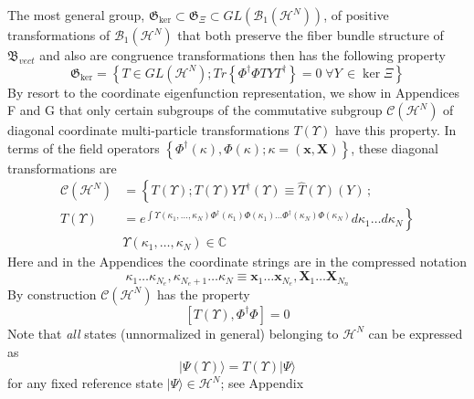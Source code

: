 \documentclass[aps,preprint]{revtex4}%
\begin{document}
The most general group, $\mathfrak{G}_{\ker}\subset\mathfrak{G}_{\Xi}\subset
GL\left(  \mathcal{B}_{1}\left(  \mathcal{H}^{N}\right)  \right)  $, of
positive transformations of $\mathcal{B}_{1}\left(  \mathcal{H}^{N}\right)  $
that both preserve the fiber bundle structure of $\mathfrak{B}_{vect}$ and
also are congruence transformations then has the following property
\begin{equation}
\mathfrak{G}_{\ker}=\left\{  T\in GL(\mathcal{H}^{N});Tr\left\{  \Phi
^{\dagger}\Phi TYT^{\dagger}\right\}  =0\;\forall Y\,\in\ker\Xi\text{
}\right\}  \label{GLkerXi}%
\end{equation}
By resort to the coordinate eigenfunction representation, we show in
Appendices F and G that only certain subgroups of the commutative subgroup
$\mathcal{C}(\mathcal{H}^{N})$ of diagonal coordinate multi-particle
transformations $T(\Upsilon)$ have this property. In terms of the field
operators $\left\{  \Phi^{\dagger}\left(  \kappa\right)  ,\Phi\left(
\kappa\right)  ;\kappa=\left(  \mathbf{x},\mathbf{X}\right)  \right\}  $,
these diagonal transformations are
\begin{align}
\mathcal{C}(\mathcal{H}^{N})  &  =\left\{  T(\Upsilon);T(\Upsilon)YT^{\dagger
}(\Upsilon)\equiv\widehat{T}(\Upsilon)(Y)\right.  \,;\nonumber\\
T(\Upsilon)  &  =\left.  e^{\int\Upsilon(\kappa_{1},\ldots,\kappa_{N}%
)\Phi^{\dagger}(\kappa_{1})\Phi(\kappa_{1})\ldots\Phi^{\dagger}(\kappa
_{N})\Phi(\kappa_{N})}d\kappa_{1}\ldots d\kappa_{N}\right\} \nonumber\\
&  \Upsilon(\kappa_{1},\ldots,\kappa_{N})\in\mathbb{C}%
\end{align}
Here and in the Appendices the coordinate strings are in the compressed
notation
\begin{equation}
\kappa_{1}\ldots\kappa_{N_{e}},\kappa_{N_{e}+1}\ldots\kappa_{N}\equiv
\mathbf{x}_{1}\ldots\mathbf{x}_{N_{e}},\mathbf{X}_{1}\ldots\mathbf{X}_{N_{n}}
\label{compressed}%
\end{equation}
By construction $\mathcal{C}(\mathcal{H}^{N})$ has the property
\begin{equation}
\left[  T(\Upsilon),\Phi^{\dagger}\Phi\right]  =0
\end{equation}
Note that \emph{all} states (unnormalized in general) belonging to
$\mathcal{H}^{N}$ can be expressed as
\begin{equation}
|\Psi(\Upsilon)\rangle=T(\Upsilon)|\Psi\rangle
\end{equation}
for any fixed reference state $|\Psi\rangle\in\mathcal{H}^{N}$; see Appendix
\end{document}
